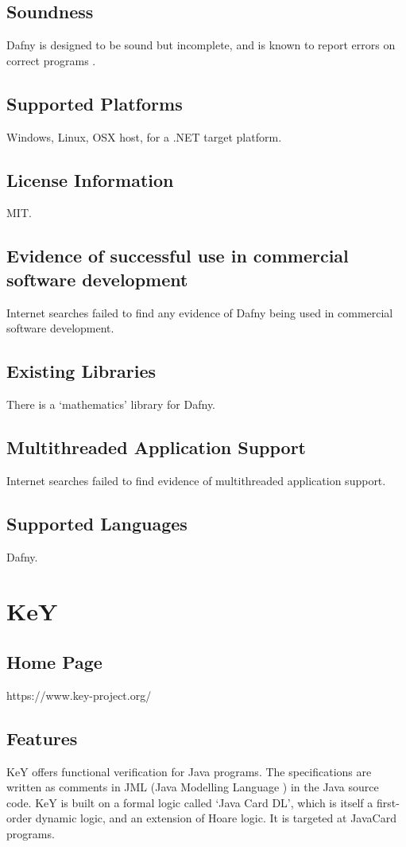 \documentclass[12pt,openany,a4paper]{book}
\begin{document}
	\subsection{Soundness}
		Dafny is designed to be sound but incomplete, and is known to report errors on correct programs \cite{dafny01}.
	\subsection{Supported Platforms}
		Windows, Linux, OSX host, for a .NET target platform.
	\subsection{License Information}
		MIT.
	\subsection{Evidence of successful use in commercial software development}
		Internet searches failed to find any evidence of Dafny being used in commercial software development. 		
	\subsection{Existing Libraries}
		There is a `mathematics' library for Dafny.
		
	\subsection{Multithreaded Application Support}
		Internet searches failed to find evidence of multithreaded application support. 
		
	\subsection{Supported Languages}
		Dafny.

\section{KeY}
	\subsection{Home Page}%
	https://www.key-project.org/
	\subsection{Features} 
		KeY offers functional verification for Java programs. The specifications are written as comments in JML (Java Modelling Language \cite{openjml}) in the Java source code. KeY is built on a formal logic called `Java Card DL', which is itself a first-order dynamic logic, and an extension of Hoare logic. It is targeted at JavaCard programs. 
\end{document}
